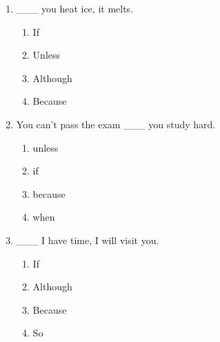 \documentclass[11pt,a4paper]{ctexart}
\begin{document}
\begin{enumerate}[leftmargin=*,itemsep=4pt]
\begin{enumerate}[label=\Alph*.,leftmargin=2em,itemsep=1pt,topsep=2pt]
\item though
\end{enumerate}
\item \_\_\_ you heat ice, it melts.
\begin{enumerate}[label=\Alph*.,leftmargin=2em,itemsep=1pt,topsep=2pt]
\item If
\item Unless
\item Although
\item Because
\end{enumerate}
\item You can’t pass the exam \_\_\_ you study hard.
\begin{enumerate}[label=\Alph*.,leftmargin=2em,itemsep=1pt,topsep=2pt]
\item unless
\item if
\item because
\item when
\end{enumerate}
\item \_\_\_ I have time, I will visit you.
\begin{enumerate}[label=\Alph*.,leftmargin=2em,itemsep=1pt,topsep=2pt]
\item If
\item Although
\item Because
\item So
\end{enumerate}
\end{enumerate}
\end{document}
